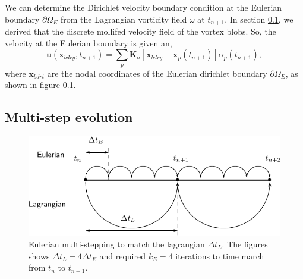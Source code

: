 We can determine the Dirichlet velocity boundary condition at the Eulerian boundary $\partial \Omega_E$ from the Lagrangian vorticity field $\omega$ at $t_{n+1}$. In section \ref{}, we derived that the discrete mollifed velocity field of the vortex blobs. So, the velocity at the Eulerian boundary is given an,
\begin{equation}
\mathbf{u}(\mathbf{x}_{bdry},t_{n+1}) = \sum_p \mathbf{K}_{\sigma}[\mathbf{x}_{bdry} - \mathbf{x}_p(t_{n+1})]\alpha_p(t_{n+1}),
\end{equation}
where $\mathbf{x}_{bdrt}$ are the nodal coordinates of the Eulerian dirichlet boundary $\partial \Omega_E$, as shown in figure \ref{}.

\subsection{Multi-step evolution}
	\begin{figure}[t]
	\centering
	\includegraphics[width=0.7\linewidth]{./figures/eulerian/multiStep-crop.pdf}
	\caption{Eulerian multi-stepping to match the lagrangian $\Delta t_L$. The figures shows $\Delta t_L = 4 \Delta t_E$ and required $k_E = 4$ iterations to time march from $t_n$ to $t_{n+1}$.}
	\label{fig:multiStep}
	\end{figure}	

